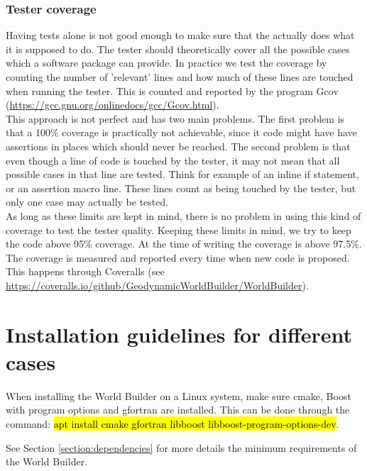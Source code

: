 \documentclass{book}
\newcommand{\WB}{{World Builder}}
\newcommand{\boost}{{Boost}}
\newcommand{\cmake}{{cmake}}
\newcommand{\gcov}{{Gcov}}
\begin{document}
\subsubsection{Tester coverage}
Having tests alone is not good enough to make sure that the actually does what it is supposed to do. The tester should theoretically cover all the possible cases which a software package can provide. In practice we test the coverage by counting the number of 'relevant' lines and how much of these lines are touched when running the tester. This is counted and reported by the program \gcov{} (\url{https://gcc.gnu.org/onlinedocs/gcc/Gcov.html}).
\\
This approach is not perfect and has two main problems. The first problem is that a 100\% coverage is practically not achievable, since it code might have have assertions in places which should never be reached. The second problem is that even though a line of code is touched by the tester, it may not mean that all possible cases in that line are tested. Think for example of an inline if statement, or an assertion macro line. These lines count as being touched by the tester, but only one case may actually be tested.
\\
As long as these limits are kept in mind, there is no problem in using this kind of coverage to test the tester quality. Keeping these limits in mind, we try to keep the code above 95\% coverage. At the time of writing the coverage is above 97.5\%. The coverage is measured and reported every time when new code is proposed. This happens through Coveralls (see \url{https://coveralls.io/github/GeodynamicWorldBuilder/WorldBuilder}).


\section{Installation guidelines for different cases}
When installing the \WB{} on a Linux system, make sure \cmake{}, \boost{} with  program options and gfortran are installed. This can be done through the command: \hl{apt install cmake gfortran libboost libboost-program-options-dev}.
\begin{remark}
See Section \ref{section:dependencies} for more details the minimum requirements of the \WB{}.
\end{remark}
\end{document}

